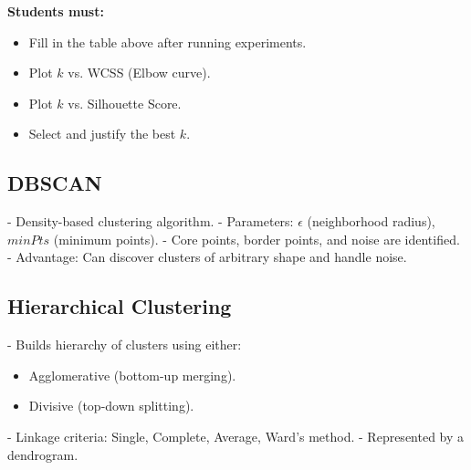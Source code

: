 \documentclass[11pt]{article}
\begin{document}
\textbf{Students must:}
\begin{itemize}
    \item Fill in the table above after running experiments.
    \item Plot $k$ vs. WCSS (Elbow curve).
    \item Plot $k$ vs. Silhouette Score.
    \item Select and justify the best $k$.
\end{itemize}

\subsection*{DBSCAN}
- Density-based clustering algorithm.  
- Parameters: $\epsilon$ (neighborhood radius), $minPts$ (minimum points).  
- Core points, border points, and noise are identified.  
- Advantage: Can discover clusters of arbitrary shape and handle noise.

\subsection*{Hierarchical Clustering}
- Builds hierarchy of clusters using either:
\begin{itemize}
    \item Agglomerative (bottom-up merging).
    \item Divisive (top-down splitting).
\end{itemize}
- Linkage criteria: Single, Complete, Average, Ward’s method.  
- Represented by a dendrogram.
\end{document}
